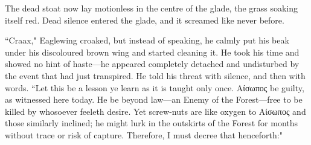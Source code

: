 The dead stoat now lay motionless in the centre of the glade, the grass soaking itself red.
Dead silence entered the glade, and it screamed like never before.


``Craax," Eaglewing croaked, but instead of speaking, he calmly put his beak under his discoloured brown wing and started cleaning it.
He took his time and showed no hint of haste---he appeared completely detached and undisturbed by the event that had just transpired.
He told his threat with silence, and then with words.
``Let this be a lesson ye learn as it is taught only once.
Αίσωπος be guilty, as witnessed here today.
He be beyond law---an Enemy of the Forest---free to be killed by whosoever feeleth desire.
Yet screw-nuts are like oxygen to Αίσωπος and those similarly inclined; he might lurk in the outskirts of the Forest for months without trace or risk of capture.
Therefore, I must decree that henceforth:"



